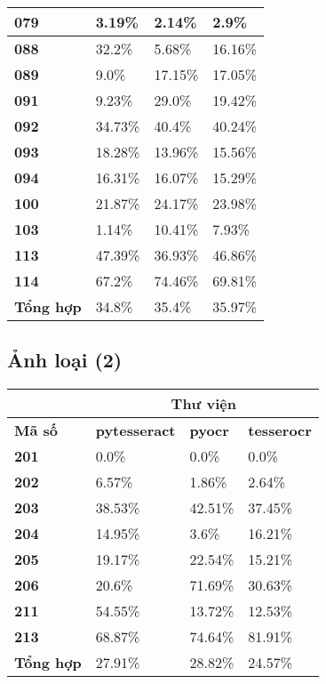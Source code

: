 \documentclass[12pt,a4paper]{article}
\begin{document}
\begin{longtable}{|p{}|p{}|p{}|p{}|}
\hline \textbf{079} & 3.19\% & 2.14\% & 2.9\% \\
\hline \textbf{088} & 32.2\% & 5.68\% & 16.16\% \\
\hline \textbf{089} & 9.0\% & 17.15\% & 17.05\% \\
\hline \textbf{091} & 9.23\% & 29.0\% & 19.42\% \\
\hline \textbf{092} & 34.73\% & 40.4\% & 40.24\% \\
\hline \textbf{093} & 18.28\% & 13.96\% & 15.56\% \\
\hline \textbf{094} & 16.31\% & 16.07\% & 15.29\% \\
\hline \textbf{100} & 21.87\% & 24.17\% & 23.98\% \\
\hline \textbf{103} & 1.14\% & 10.41\% & 7.93\% \\
\hline \textbf{113} & 47.39\% & 36.93\% & 46.86\% \\
\hline \textbf{114} & 67.2\% & 74.46\% & 69.81\% \\
\hline \textbf{Tổng hợp} & 34.8\% & 35.4\% & 35.97\% \\
\hline
\end{longtable}

\subsection{Ảnh loại (2)}

\begin{longtable}{|p{}|p{}|p{}|p{}|}
\hline & \multicolumn{3}{c|}{Thư viện} \\
\hline \textbf{Mã số} & \textbf{pytesseract} & \textbf{pyocr} & \textbf{tesserocr} \\
\hline \textbf{201} & 0.0\% & 0.0\% & 0.0\% \\
\hline \textbf{202} & 6.57\% & 1.86\% & 2.64\% \\
\hline \textbf{203} & 38.53\% & 42.51\% & 37.45\% \\
\hline \textbf{204} & 14.95\% & 3.6\% & 16.21\% \\
\hline \textbf{205} & 19.17\% & 22.54\% & 15.21\% \\
\hline \textbf{206} & 20.6\% & 71.69\% & 30.63\% \\
\hline \textbf{211} & 54.55\% & 13.72\% & 12.53\% \\
\hline \textbf{213} & 68.87\% & 74.64\% & 81.91\% \\
\hline \textbf{Tổng hợp} & 27.91\% & 28.82\% & 24.57\% \\
\hline
\end{longtable}
\end{document}
